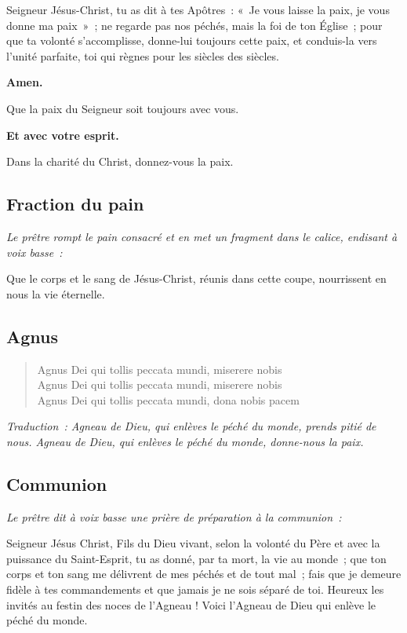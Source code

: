 Seigneur Jésus-Christ, tu as dit à tes Apôtres~: «~Je vous laisse la            
paix, je vous donne ma paix~»~; ne regarde pas nos péchés, mais la
foi de ton Église~; pour que ta volonté s'accomplisse, donne-lui
toujours cette paix, et conduis-la vers l'unité parfaite, toi qui
règnes pour les siècles des siècles.

{\bf Amen.}

Que la paix du Seigneur soit toujours avec vous.

{\bf Et avec votre esprit.}

Dans la charité du Christ, donnez-vous la paix.

\subsection*{Fraction du pain}

\emph{Le prêtre rompt le pain consacré et en met un fragment dans le            
calice, endisant à voix basse~:}

Que le corps et le sang de Jésus-Christ, réunis dans cette coupe,
nourrissent en nous la vie éternelle.

\subsection*{Agnus}

\begin{verse}
 Agnus Dei qui tollis peccata mundi, miserere nobis \\
 Agnus Dei qui tollis peccata mundi, miserere nobis \\
 Agnus Dei qui tollis peccata mundi, dona nobis pacem \\
\end{verse}

\emph{Traduction~:                                                              
Agneau de Dieu, qui enlèves le péché du monde,                                  
prends pitié de nous.                                                           
Agneau de Dieu, qui enlèves le péché du monde,                                  
donne-nous la paix.}

\subsection*{Communion}

\emph{Le prêtre dit à voix basse une prière de préparation à la                 
communion~:}

Seigneur Jésus Christ, Fils du Dieu vivant, selon la volonté du Père
et avec la puissance du Saint-Esprit, tu as donné, par ta mort, la vie
au monde~; que ton corps et ton sang me délivrent de mes péchés et de
tout mal~; fais que je demeure fidèle à tes commandements et que
jamais je ne sois séparé de toi.
Heureux les invités au festin des noces de l'Agneau !
Voici l'Agneau de Dieu qui enlève le péché du monde.

